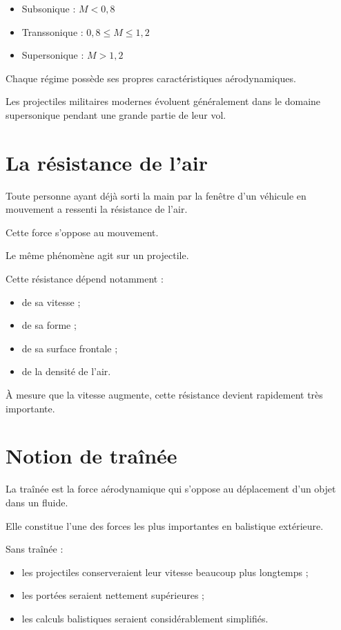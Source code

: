 \begin{exemple}

\begin{itemize}
    \item Subsonique : $M < 0,8$
    \item Transsonique : $0,8 \le M \le 1,2$
    \item Supersonique : $M > 1,2$
\end{itemize}

\end{exemple}

Chaque régime possède ses propres caractéristiques aérodynamiques.

Les projectiles militaires modernes évoluent généralement dans le domaine
supersonique pendant une grande partie de leur vol.

\section{La résistance de l'air}

Toute personne ayant déjà sorti la main par la fenêtre d'un véhicule en
mouvement a ressenti la résistance de l'air.

Cette force s'oppose au mouvement.

Le même phénomène agit sur un projectile.

Cette résistance dépend notamment :

\begin{itemize}
\item de sa vitesse ;
\item de sa forme ;
\item de sa surface frontale ;
\item de la densité de l'air.
\end{itemize}

À mesure que la vitesse augmente, cette résistance devient rapidement très
importante.

\section{Notion de traînée}

La traînée est la force aérodynamique qui s'oppose au déplacement d'un
objet dans un fluide.

Elle constitue l'une des forces les plus importantes en balistique
extérieure.

Sans traînée :

\begin{itemize}
\item les projectiles conserveraient leur vitesse beaucoup plus
longtemps ;
\item les portées seraient nettement supérieures ;
\item les calculs balistiques seraient considérablement simplifiés.
\end{itemize}

